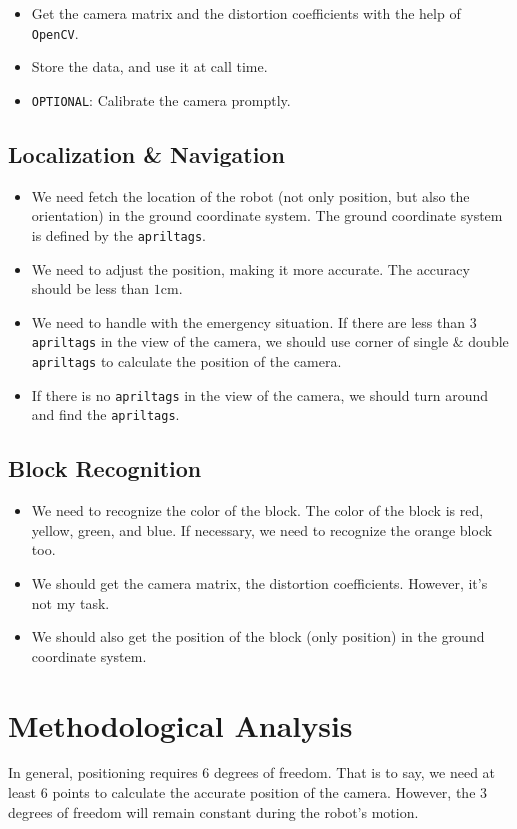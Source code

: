 \documentclass{article}
\begin{document}
\begin{itemize}
  \item Get the camera matrix and the distortion coefficients with the help of \texttt{OpenCV}.
  \item Store the data, and use it at call time.
  \item \texttt{OPTIONAL}: Calibrate the camera promptly.
\end{itemize}

\subsection{Localization \& Navigation}

\begin{itemize}
  \item We need fetch the location of the robot (not only position, but also the orientation) in the ground coordinate system. The ground coordinate system is defined by the \texttt{apriltags}.
  \item We need to adjust the position, making it more accurate. The accuracy should be less than $1\mathrm{cm}$.
  \item We need to handle with the emergency situation. If there are less than $3$ \texttt{apriltags} in the view of the camera, we should use corner of single \& double \texttt{apriltags} to calculate the position of the camera.
  \item If there is no \texttt{apriltags} in the view of the camera, we should turn around and find the \texttt{apriltags}.
\end{itemize}

\subsection{Block Recognition}

\begin{itemize}
  \item We need to recognize the color of the block. The color of the block is red, yellow, green, and blue. If necessary, we need to recognize the orange block too.
  \item We should get the camera matrix, the distortion coefficients. However, it's not my task.
  \item We should also get the position of the block (only position) in the ground coordinate system.
\end{itemize}

\section{Methodological Analysis}
In general, positioning requires $6$ degrees of freedom. That is to say, we need at least $6$ points to calculate the accurate position of the camera. However, the $3$ degrees of freedom will remain constant during the robot's motion.
\end{document}
